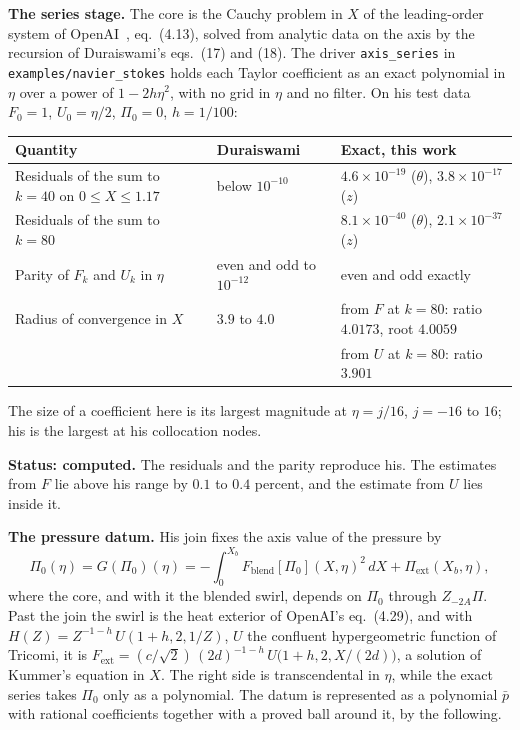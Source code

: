 \textbf{The series stage.} The core is the Cauchy problem in $X$ of the leading-order system of
OpenAI~\cite{src:OpenAI-2026-Navier-Stokes}, eq.\ (4.13), solved from analytic data on the axis by
the recursion of Duraiswami's eqs.\ (17) and (18). The driver \texttt{axis\_series} in
\texttt{examples/navier\_stokes} holds each Taylor coefficient as an exact polynomial in $\eta$
over a power of $1 - 2h\eta^2$, with no grid in $\eta$ and no filter. On his test data
$F_0 = 1$, $U_0 = \eta/2$, $\Pi_0 = 0$, $h = 1/100$:

\begin{center}
\small
\begin{tabular}{@{}lll@{}}
\toprule
Quantity & Duraiswami & Exact, this work \\
\midrule
Residuals of the sum to $k = 40$ on $0 \le X \le 1.17$ & below $10^{-10}$ & $4.6\times 10^{-19}$ ($\theta$), $3.8\times 10^{-17}$ ($z$) \\
Residuals of the sum to $k = 80$ & & $8.1\times 10^{-40}$ ($\theta$), $2.1\times 10^{-37}$ ($z$) \\
Parity of $F_k$ and $U_k$ in $\eta$ & even and odd to $10^{-12}$ & even and odd exactly \\
Radius of convergence in $X$ & $3.9$ to $4.0$ & from $F$ at $k = 80$: ratio $4.0173$, root $4.0059$ \\
 & & from $U$ at $k = 80$: ratio $3.901$ \\
\bottomrule
\end{tabular}
\end{center}

The size of a coefficient here is its largest magnitude at $\eta = j/16$, $j = -16$ to $16$; his is
the largest at his collocation nodes.

\textbf{Status: computed.} The residuals and the parity reproduce his. The estimates from $F$ lie
above his range by $0.1$ to $0.4$ percent, and the estimate from $U$ lies inside it.

\textbf{The pressure datum.} His join fixes the axis value of the pressure by
\[
\Pi_0(\eta) = G(\Pi_0)(\eta) = -\int_0^{X_b} F_{\mathrm{blend}}[\Pi_0](X,\eta)^2\,dX
+ \Pi_{\mathrm{ext}}(X_b,\eta),
\]
where the core, and with it the blended swirl, depends on $\Pi_0$ through $Z_{-2A}\Pi$. Past the
join the swirl is the heat exterior of OpenAI's eq.\ (4.29), and with
$H(Z) = Z^{-1-h}\,U(1+h, 2, 1/Z)$, $U$ the confluent hypergeometric function of Tricomi, it is
$F_{\mathrm{ext}} = (c/\sqrt{2})\,(2d)^{-1-h}\,U\bigl(1+h, 2, X/(2d)\bigr)$, a solution of Kummer's
equation in $X$. The right
side is transcendental in $\eta$, while the exact series takes $\Pi_0$ only as a polynomial. The
datum is represented as a polynomial $\bar p$ with rational coefficients together with a proved ball
around it, by the following.

